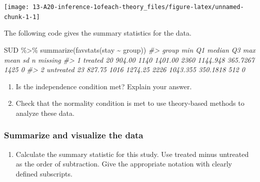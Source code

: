 \documentclass[
]{report}
\newenvironment{Shaded}{\begin{snugshade}}{\end{snugshade}}
\newcommand{\CommentTok}[1]{\textcolor[rgb]{0.56,0.35,0.01}{\textit{#1}}}
\newcommand{\FunctionTok}[1]{\textcolor[rgb]{0.00,0.00,0.00}{#1}}
\newcommand{\NormalTok}[1]{#1}
\newcommand{\SpecialCharTok}[1]{\textcolor[rgb]{0.00,0.00,0.00}{#1}}
\providecommand{\tightlist}{%
  \setlength{\itemsep}{0pt}\setlength{\parskip}{0pt}}
\begin{document}
\begin{center}\texttt{[image: 13-A20-inference-1ofeach-theory\_files/figure-latex/unnamed-chunk-1-1]} \end{center}

The following code gives the summary statistics for the data.

\begin{Shaded}
\begin{Highlighting}[]
\NormalTok{SUD }\SpecialCharTok{\%\textgreater{}\%}
  \FunctionTok{summarize}\NormalTok{(}\FunctionTok{favstats}\NormalTok{(stay }\SpecialCharTok{\textasciitilde{}}\NormalTok{ group))}
\CommentTok{\#\textgreater{}       group min     Q1 median      Q3  max     mean       sd    n missing}
\CommentTok{\#\textgreater{} 1   treated  20 904.00   1140 1401.00 2360 1144.948 365.7267 1425       0}
\CommentTok{\#\textgreater{} 2 untreated  23 827.75   1016 1274.25 2226 1043.355 350.1818  512       0}
\end{Highlighting}
\end{Shaded}

\begin{enumerate}
\def\labelenumi{\arabic{enumi}.}
\setcounter{enumi}{2}
\item
  Is the independence condition met? Explain your answer.
  \vspace{0.4in}
\item
  Check that the normality condition is met to use theory-based methods to analyze these data.
\end{enumerate}

\vspace{0.8in}

\hypertarget{summarize-and-visualize-the-data-5}{%
\subsubsection*{Summarize and visualize the data}\label{summarize-and-visualize-the-data-5}}

\begin{enumerate}
\def\labelenumi{\arabic{enumi}.}
\setcounter{enumi}{4}
\tightlist
\item
  Calculate the summary statistic for this study. Use treated minus untreated as the order of subtraction. Give the appropriate notation with clearly defined subscripts.
\end{enumerate}

\vspace{0.8in}
\end{document}
